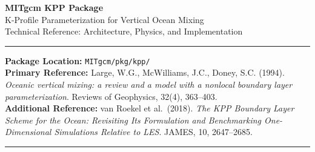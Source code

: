 \documentclass[12pt,letterpaper]{article}
\begin{document}
  
  
\begin{titlepage}  
\begin{center}  
\vspace*{2cm}  
  
{\Huge\color{sectioncolor}\bfseries MITgcm KPP Package}\\[0.5cm]  
{\Large\color{fortranblue} K-Profile Parameterization for Vertical Ocean Mixing}\\[0.5cm]  
{\large\color{gray} Technical Reference: Architecture, Physics, and Implementation}  
  
\vspace{1.5cm}  
\rule{\linewidth}{2pt}  
\vspace{0.5cm}  
  
\begin{infobox}  
\textbf{Package Location:} \texttt{MITgcm/pkg/kpp/}\\[4pt]  
\textbf{Primary Reference:} Large, W.G., McWilliams, J.C., Doney, S.C. (1994).  
\textit{Oceanic vertical mixing: a review and a model with a nonlocal boundary layer  
parameterization}. Reviews of Geophysics, 32(4), 363--403.\\[4pt]  
\textbf{Additional Reference:} van Roekel et al.\ (2018). \textit{The KPP Boundary  
Layer Scheme for the Ocean: Revisiting Its Formulation and Benchmarking  
One-Dimensional Simulations Relative to LES}. JAMES, 10, 2647--2685.  
\end{infobox}  
  
\vspace{1cm}  
\rule{\linewidth}{1pt}  
\vspace{0.5cm}  
  

\end{center}
\end{titlepage}
\end{document}
